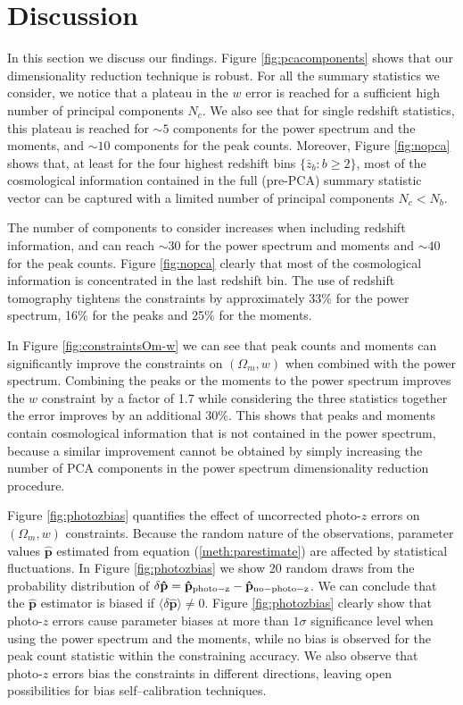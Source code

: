 \documentclass[reprint,aps,prd,superscriptaddress,showkeys,showpacs]{revtex4-1}
\newcommand{\bbh}[1]{\mathbf{\hat{#1}}}
\begin{document}

\section{Discussion}
In this section we discuss our findings. Figure \ref{fig:pcacomponents} shows that our dimensionality reduction technique is robust. For all the summary statistics we consider, we notice that a plateau in the $w$ error is reached for a sufficient high number of principal components $N_c$. We also see that for single redshift statistics, this plateau is reached for $\sim 5$ components for the power spectrum and the moments, and $\sim 10$ components for the peak counts. Moreover, Figure \ref{fig:nopca} shows that, at least for the four highest redshift bins $\{\bar{z}_b: b\geq 2\}$, most of the cosmological information contained in the full (pre-PCA) summary statistic vector can be captured with a limited number of principal components $N_c<N_b$.   

The number of components to consider increases when including redshift information, and can reach $\sim 30$ for the power spectrum and moments and $\sim 40$ for the peak counts. Figure \ref{fig:nopca} clearly that most of the cosmological information is concentrated in the last redshift bin. The use of redshift tomography tightens the constraints by approximately 33\% for the power spectrum, 16\% for the peaks and 25\% for the moments.  

In Figure \ref{fig:constraintsOm-w} we can see that peak counts and moments can significantly improve the constraints on $(\Omega_m,w)$ when combined with the power spectrum. Combining the peaks or the moments to the power spectrum improves the $w$ constraint by a factor of 1.7 while considering the three statistics together the error improves by an additional $30\%$. This shows that peaks and moments contain cosmological information that is not contained in the power spectrum, because a similar improvement cannot be obtained by simply increasing the number of PCA components in the power spectrum dimensionality reduction procedure. 

Figure \ref{fig:photozbias} quantifies the effect of uncorrected photo-$z$ errors on $(\Omega_m,w)$ constraints. Because the random nature of the observations, parameter values $\bbh{p}$ estimated from equation (\ref{meth:parestimate}) are affected by statistical fluctuations. In Figure \ref{fig:photozbias} we show 20 random draws from the probability distribution of $\delta \bbh{p}=\bbh{p}_{\rm photo-z}-\bbh{p}_{\rm no-photo-z}$. We can conclude that the $\bbh{p}$ estimator is biased if $\langle\delta\bbh{p}\rangle\neq 0$. Figure \ref{fig:photozbias} clearly show that photo-$z$ errors cause parameter biases at more than $1\sigma$ significance level when using the power spectrum and the moments, while no bias is observed for the peak count statistic within the constraining accuracy. We also observe that photo-$z$ errors bias the constraints in different directions, leaving open possibilities for bias self--calibration techniques.         
\end{document}
